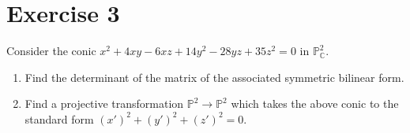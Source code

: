 \documentclass{article}
\theoremstyle{definition}
\theoremstyle{definition}
\theoremstyle{remark}
\begin{document}
\section*{Exercise 3}
Consider the conic \(x^2 + 4xy - 6xz + 14y^2 - 28yz + 35z^2 = 0\) in \(\mathbb{P}^2_\mathbb{C}\).

\begin{enumerate}
    \item Find the determinant of the matrix of the associated symmetric bilinear form.
	
    \item Find a projective transformation \(\mathbb{P}^2 \rightarrow \mathbb{P}^2\) which takes the above conic to the standard form \((x')^2 + (y')^2 + (z')^2 = 0\).
\end{enumerate}

\end{document}
